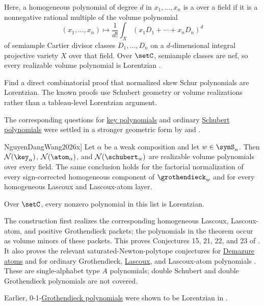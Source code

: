 Here, a homogeneous polynomial of degree \(d\) in \(x_1,\dotsc,x_n\) is a
 over a field if it is a nonnegative
rational multiple of the volume polynomial
\[
  (x_1,\dotsc,x_n) \mapsto \frac{1}{d!}\int_X (x_1 D_1 + \dotsb + x_n D_n)^d
\]
of semiample Cartier divisor classes \(D_1,\dotsc,D_n\) on a \(d\)-dimensional
integral projective variety \(X\) over that field.  Over \(\setC\), semiample
classes are nef, so every realizable volume polynomial is Lorentzian
\cite[Thm.~4.6]{BrandenHuh2020}.

\begin{problem}
Find a direct combinatorial proof that normalized skew Schur polynomials are
Lorentzian.  The known proofs use Schubert geometry or volume
realizations rather than a tableau-level Lorentzian argument.
\end{problem}

The corresponding questions for \hyperref[key]{key polynomials} and ordinary
\hyperref[schubert]{Schubert polynomials} were
settled in a stronger geometric form by  and
.

\begin{theorem}[Nguyen-Dang--Wang, \cite[Thm.~1.1]{NguyenDangWang2026x}]
Let $\alpha$ be a weak composition and let $w\in\symS_n$.  Then
$\mathcal{N}(\key_\alpha)$, $\mathcal{N}(\atom_\alpha)$, and
$\mathcal{N}(\schubert_w)$ are realizable volume polynomials over every
field.  The same conclusion holds for the factorial normalization of every
sign-corrected homogeneous component of $\grothendieck_w$ and for every
homogeneous Lascoux and Lascoux-atom layer.

Over $\setC$, every nonzero polynomial in this list is Lorentzian.
\end{theorem}

The construction first realizes the corresponding homogeneous Lascoux,
Lascoux-atom, and positive Grothendieck packets; the polynomials in the theorem
occur as volume minors of these packets.  This proves Conjectures 15, 21, 22,
and 23 of \cite{HuhMatherneMezarosDizier2022}.  It also proves the relevant
saturated-Newton-polytope conjectures for
\hyperref[demazureAtom]{Demazure atoms} and for ordinary
Grothendieck, \hyperref[lascoux]{Lascoux}, and Lascoux-atom polynomials
\cite{MonicalTokcanYong2019}.  These are single-alphabet type $A$
polynomials; double Schubert and double Grothendieck polynomials are not
covered.

Earlier, 0-1-\hyperref[grothendieck]{Grothendieck polynomials} were shown to
be Lorentzian in \cite{ChenFanYe2024x}.


